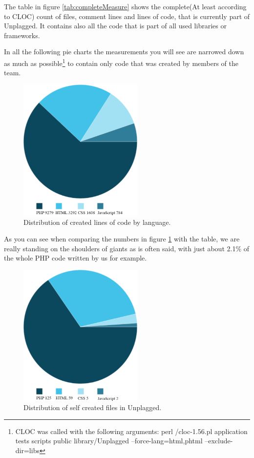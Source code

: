 The table in figure \ref{tab:completeMeasure} shows the complete(At least according to CLOC) count of files, comment lines and lines of code, that is currently part of Unplagged. It contains also all the code 
that is part of all used libraries or frameworks.

In all the following pie charts the measurements you will see are narrowed down as much as possible\footnote{CLOC was called with the following arguments: perl /cloc-1.56.pl application tests scripts public library/Unplagged --force-lang=html,phtml --exclude-dir=libs} to contain only code that was created by members of the team.

\begin{figure}[!h]
  \centering
    \includegraphics[width=0.55\textwidth]{images/loc.png}
  \caption{Distribution of created lines of code by language.}
  \label{fig:locDistribution}
\end{figure}

As you can see when comparing the numbers in figure \ref{fig:locDistribution} with the table, we are really standing on the shoulders of giants as is often said, with just about 2.1\% of the whole PHP code written by us for example.

\begin{figure}[!h]
  \centering
    \includegraphics[width=0.55\textwidth]{images/files.png}
  \caption{Distribution of self created files in Unplagged.}
  \label{fig:fileDistribution}
\end{figure}

